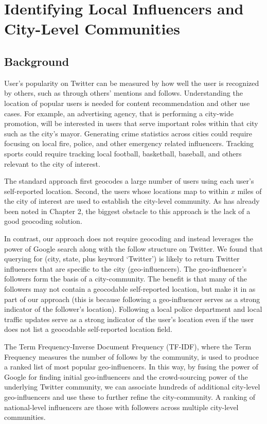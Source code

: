 \chapter{Identifying Local Influencers and City-Level Communities}\label{chap3}

\setlength{\abovedisplayskip}{-10pt} \setlength{\abovedisplayshortskip}{-10pt}

\section{Background}
User's popularity on Twitter can be measured by how well the user is recognized by others, such as through others' mentions and follows. Understanding the location of popular users is needed for content recommendation and other use cases. For example, an advertising agency, that is performing a city-wide promotion, will be interested in users that serve important roles within that city such as the city's mayor. Generating crime statistics across cities could require focusing on local fire, police, and other emergency related influencers. Tracking sports could require tracking local football, basketball, baseball, and others relevant to the city of interest. 

The standard approach first geocodes a large number of users using each user's self-reported location. Second, the users whose locations map to within $x$ miles of the city of interest are used to establish the city-level community. As has already been noted in Chapter 2, the biggest obstacle to this approach is the lack of a good geocoding solution. 

In contrast, our approach does not require geocoding and instead leverages the power of Google search along with the follow structure on Twitter. We found that querying for (city, state, plus keyword `Twitter') is likely to return Twitter influencers that are specific to the city (geo-influencers). The geo-influencer's followers form the basis of a city-community. The benefit is that many of the followers may not contain a geocodable self-reported location, but make it in as part of our approach (this is because following a geo-influencer serves as a strong indicator of the follower's location). Following a local police department and local traffic updates serve as a strong indicator of the user's location even if the user does not list a geocodable self-reported location field. 
 
The Term Frequency-Inverse Document Frequency (TF-IDF), where the Term Frequency measures the number of follows by the community, is used to produce a ranked list of most popular geo-influencers. In this way, by fusing the power of Google for finding initial geo-influencers and the crowd-sourcing power of the underlying Twitter community, we can associate hundreds of additional city-level geo-influencers and use these to further refine the city-community. A ranking of national-level influencers are those with followers across multiple city-level communities.

